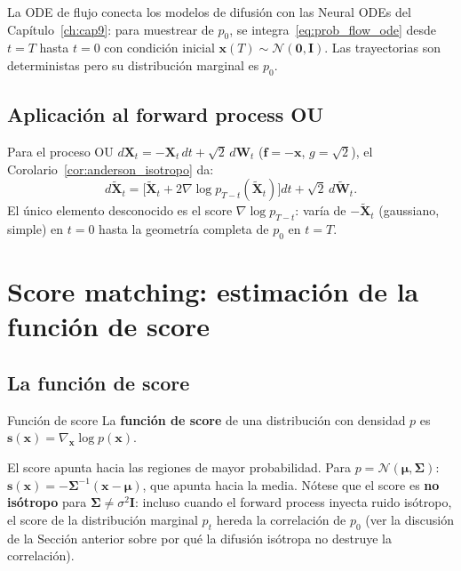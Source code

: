 La ODE de flujo conecta los modelos de difusión con las Neural ODEs del
Capítulo~\ref{ch:cap9}: para muestrear de $p_0$, se integra~\eqref{eq:prob_flow_ode} desde
$t=T$ hasta $t=0$ con condición inicial $\bm{x}(T)\sim\mathcal{N}(\bm{0},\bm{I})$.
Las trayectorias son deterministas pero su distribución marginal es $p_0$.

\subsection{Aplicación al forward process OU}
\label{subsec:anderson_ou}

Para el proceso OU $d\bm{X}_t = -\bm{X}_t\,dt + \sqrt{2}\,d\bm{W}_t$
($\bm{f} = -\bm{x}$, $g = \sqrt{2}$), el Corolario~\ref{cor:anderson_isotropo}
da:
\begin{equation}
  d\tilde{\bm{X}}_t
  = \Big[\tilde{\bm{X}}_t
  + 2\nabla\log p_{T-t}(\tilde{\bm{X}}_t)\Big]dt
  + \sqrt{2}\,d\tilde{\bm{W}}_t.
  \label{eq:reverse_ou}
\end{equation}
El único elemento desconocido es el score $\nabla\log p_{T-t}$: varía de
$-\tilde{\bm{X}}_t$ (gaussiano, simple) en $t=0$ hasta la geometría completa
de $p_0$ en $t=T$.

\section{Score matching: estimación de la función de score}
\label{sec:score_matching}

\subsection{La función de score}
\label{subsec:score_def}

\begin{definicion}{Función de score}
La \textbf{función de score} de una distribución con densidad $p$ es
$\bm{s}(\bm{x}) = \nabla_{\bm{x}}\log p(\bm{x})$.
\end{definicion}

El score apunta hacia las regiones de mayor probabilidad. Para $p =
\mathcal{N}(\bm{\mu},\bm{\Sigma})$: $\bm{s}(\bm{x}) = -\bm{\Sigma}^{-1}
(\bm{x}-\bm{\mu})$, que apunta hacia la media. Nótese que el score es
\textbf{no isótropo} para $\bm{\Sigma} \neq \sigma^2\bm{I}$: incluso cuando
el forward process inyecta ruido isótropo, el score de la distribución marginal
$p_t$ hereda la correlación de $p_0$ (ver la discusión de la Sección anterior
sobre por qué la difusión isótropa no destruye la correlación).

